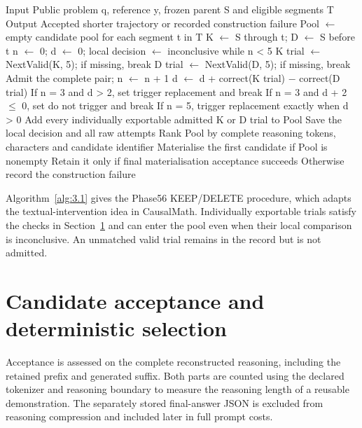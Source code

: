\begin{algorithm}[htbp]
\caption{Frozen-parent candidate search executed in Phase56}\label{alg:3.1}
\SetAlgoNoLine
\DontPrintSemicolon
Input  Public problem q, reference y, frozen parent S and eligible segments T\;
Output  Accepted shorter trajectory or recorded construction failure\;
Pool \ensuremath{\leftarrow} empty candidate pool\;
for each segment t in T\;
\Indp
K \ensuremath{\leftarrow} S through t; D \ensuremath{\leftarrow} S before t\;
n \ensuremath{\leftarrow} 0; d \ensuremath{\leftarrow} 0; local decision \ensuremath{\leftarrow} inconclusive\;
while n \textless{} 5\;
\Indp
K trial \ensuremath{\leftarrow} NextValid(K, 5); if missing, break\;
D trial \ensuremath{\leftarrow} NextValid(D, 5); if missing, break\;
Admit the complete pair; n \ensuremath{\leftarrow} n + 1\;
d \ensuremath{\leftarrow} d + correct(K trial) \ensuremath{-} correct(D trial)\;
If n = 3 and d \textgreater{} 2, set trigger replacement and break\;
If n = 3 and d + 2 \ensuremath{\leq} 0, set do not trigger and break\;
If n = 5, trigger replacement exactly when d \textgreater{} 0\;
\Indm
Add every individually exportable admitted K or D trial to Pool\;
Save the local decision and all raw attempts\;
\Indm
Rank Pool by complete reasoning tokens, characters and candidate identifier\;
Materialise the first candidate if Pool is nonempty\;
Retain it only if final materialisation acceptance succeeds\;
Otherwise record the construction failure\;
\end{algorithm}

Algorithm~\ref{alg:3.1} gives the Phase56 KEEP/DELETE procedure, which adapts the textual-intervention idea in CausalMath. Individually exportable trials satisfy the checks in Section~\ref{sec:3.5} and can enter the pool even when their local comparison is inconclusive. An unmatched valid trial remains in the record but is not admitted.

\section{Candidate acceptance and deterministic selection}\label{sec:3.5}

Acceptance is assessed on the complete reconstructed reasoning, including the retained prefix and generated suffix. Both parts are counted using the declared tokenizer and reasoning boundary to measure the reasoning length of a reusable demonstration. The separately stored final-answer JSON is excluded from reasoning compression and included later in full prompt costs.

